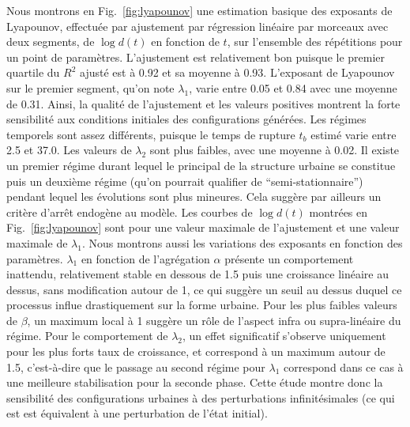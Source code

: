 \documentclass[11pt]{article}
\begin{document}
Nous montrons en Fig.~\ref{fig:lyapounov} une estimation basique des exposants de Lyapounov, effectuée par ajustement par régression linéaire par morceaux avec deux segments, de $\log d(t)$ en fonction de $t$, sur l'ensemble des répétitions pour un point de paramètres. L'ajustement est relativement bon puisque le premier quartile du $R^2$ ajusté est à 0.92 et sa moyenne à 0.93. L'exposant de Lyapounov sur le premier segment, qu'on note $\lambda_1$, varie entre 0.05 et 0.84 avec une moyenne de 0.31. Ainsi, la qualité de l'ajustement et les valeurs positives montrent la forte sensibilité aux conditions initiales des configurations générées. Les régimes temporels sont assez différents, puisque le temps de rupture $t_b$ estimé varie entre 2.5 et 37.0. Les valeurs de $\lambda_2$ sont plus faibles, avec une moyenne à 0.02. Il existe un premier régime durant lequel le principal de la structure urbaine se constitue puis un deuxième régime (qu'on pourrait qualifier de ``semi-stationnaire'') pendant lequel les évolutions sont plus mineures. Cela suggère par ailleurs un critère d'arrêt endogène au modèle. Les courbes de $\log d(t)$ montrées en Fig.~\ref{fig:lyapounov} sont pour une valeur maximale de l'ajustement et une valeur maximale de $\lambda_1$. Nous montrons aussi les variations des exposants en fonction des paramètres. $\lambda_1$ en fonction de l'agrégation $\alpha$ présente un comportement inattendu, relativement stable en dessous de 1.5 puis une croissance linéaire au dessus, sans modification autour de 1, ce qui suggère un seuil au dessus duquel ce processus influe drastiquement sur la forme urbaine. Pour les plus faibles valeurs de $\beta$, un maximum local à 1 suggère un rôle de l'aspect infra ou supra-linéaire du régime. Pour le comportement de $\lambda_2$, un effet significatif s'observe uniquement pour les plus forts taux de croissance, et correspond à un maximum autour de 1.5, c'est-à-dire que le passage au second régime pour $\lambda_1$ correspond dans ce cas à une meilleure stabilisation pour la seconde phase. Cette étude montre donc la sensibilité des configurations urbaines à des perturbations infinitésimales (ce qui est est équivalent à une perturbation de l'état initial).
\end{document}
